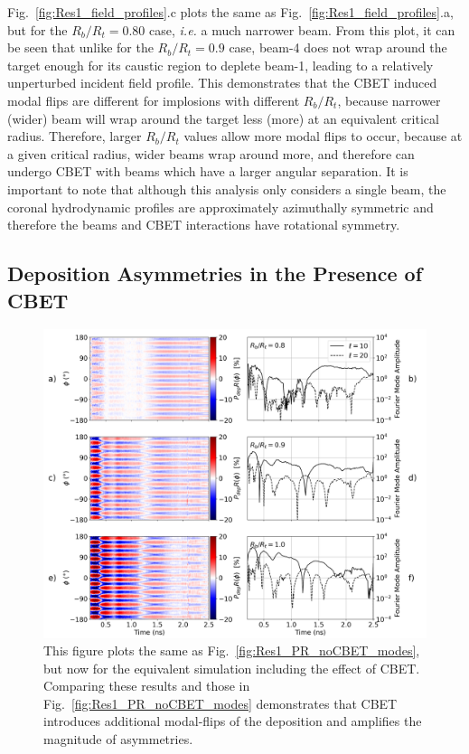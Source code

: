 Fig.~\ref{fig:Res1_field_profiles}.c plots the same as Fig.~\ref{fig:Res1_field_profiles}.a, but for the $R_b/R_t=0.80$ case, \textit{i.e.} a much narrower beam.
From this plot, it can be seen that unlike for the $R_b/R_t=0.9$ case, beam-4 does not wrap around the target enough for its caustic region to deplete beam-1, leading to a relatively unperturbed incident field profile.
This demonstrates that the \ac{CBET} induced modal flips are different for implosions with different $R_b/R_t$, because narrower (wider) beam will wrap around the target less (more) at an equivalent critical radius.
Therefore, larger $R_b/R_t$ values allow more modal flips to occur, because at a given critical radius, wider beams wrap around more, and therefore can undergo \ac{CBET} with beams which have a larger angular separation.
It is important to note that although this analysis only considers a single beam, the coronal hydrodynamic profiles are approximately azimuthally symmetric and therefore the beams and \ac{CBET} interactions have rotational symmetry.

\subsection{Deposition Asymmetries in the Presence of CBET}%
\label{sec:Res1_CBET_asymmetries}

\begin{figure}[t!]
    \includegraphics[width=\linewidth]{Results1/Images/CBET_PR_modes.png}
    \centering
    \caption{This figure plots the same as Fig.~\ref{fig:Res1_PR_noCBET_modes}, but now for the equivalent simulation including the effect of \ac{CBET}.
    Comparing these results and those in Fig.~\ref{fig:Res1_PR_noCBET_modes} demonstrates that \ac{CBET} introduces additional modal-flips of the deposition and amplifies the magnitude of asymmetries.}%
    \label{fig:Res1_PR_CBET_modes}
\end{figure}

